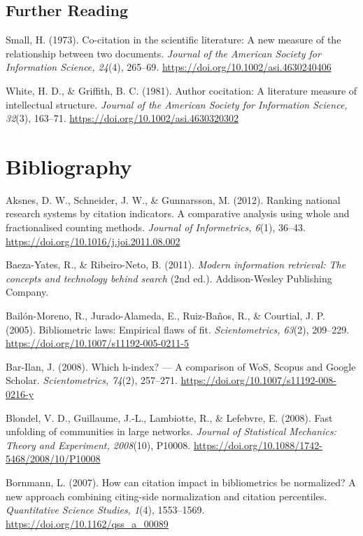\documentclass[
  letterpaper,
]{scrreprt}
\begin{document}
\section{Further Reading}\label{further-reading-13}

Small, H. (1973). Co-citation in the scientific literature: A new
measure of the relationship between two documents. \emph{Journal of the
American Society for Information Science, 24}(4), 265--69.
\url{https://doi.org/10.1002/asi.4630240406}

White, H. D., \& Griffith, B. C. (1981). Author cocitation: A literature
measure of intellectual structure. \emph{Journal of the American Society
for Information Science, 32}(3), 163--71.
\url{https://doi.org/10.1002/asi.4630320302}


\chapter{Bibliography}\label{bibliography}

Aksnes, D. W., Schneider, J. W., \& Gunnarsson, M. (2012). Ranking
national research systems by citation indicators. A comparative analysis
using whole and fractionalised counting methods. \emph{Journal of
Informetrics, 6}(1), 36--43.
\url{https://doi.org/10.1016/j.joi.2011.08.002}

Baeza-Yates, R., \& Ribeiro-Neto, B. (2011). \emph{Modern information
retrieval: The concepts and technology behind search} (2nd ed.).
Addison-Wesley Publishing Company.

Bailón-Moreno, R., Jurado-Alameda, E., Ruiz-Baños, R., \& Courtial, J.
P. (2005). Bibliometric laws: Empirical flaws of fit.
\emph{Scientometrics, 63}(2), 209--229.
\url{https://doi.org/10.1007/s11192-005-0211-5}

Bar-Ilan, J. (2008). Which h-index? --- A comparison of WoS, Scopus and
Google Scholar. \emph{Scientometrics, 74}(2), 257--271.
\url{https://doi.org/10.1007/s11192-008-0216-y}

Blondel, V. D., Guillaume, J.-L., Lambiotte, R., \& Lefebvre, E. (2008).
Fast unfolding of communities in large networks. \emph{Journal of
Statistical Mechanics: Theory and Experiment, 2008}(10), P10008.
\url{https://doi.org/10.1088/1742-5468/2008/10/P10008}

Bornmann, L. (2007). How can citation impact in bibliometrics be
normalized? A new approach combining citing-side normalization and
citation percentiles. \emph{Quantitative Science Studies, 1}(4),
1553--1569. \url{https://doi.org/10.1162/qss_a_00089}
\end{document}
